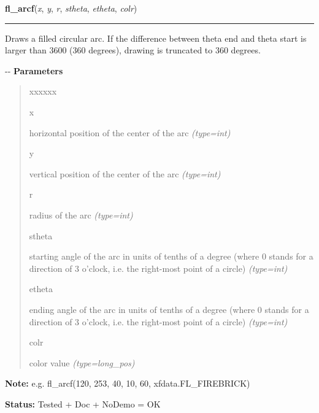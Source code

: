     \label{xformslib:flxbasic:fl_arcf}

    \vspace{0.5ex}

\hspace{.8\funcindent}\begin{boxedminipage}{\funcwidth}

    \raggedright \textbf{fl\_arcf}(\textit{x}, \textit{y}, \textit{r}, \textit{stheta}, \textit{etheta}, \textit{colr})

    \vspace{-1.5ex}

    \rule{\textwidth}{0.5\fboxrule}
\setlength{\parskip}{2ex}

Draws a filled circular arc. If the difference between theta end and
theta start is larger than 3600 (360 degrees), drawing is truncated to
360 degrees.

-{}-
\setlength{\parskip}{1ex}
      \textbf{Parameters}
      \vspace{-1ex}

      \begin{quote}
        \begin{Ventry}{xxxxxx}

          \item[x]


horizontal position of the center of the arc
            {\it (type=int)}

          \item[y]


vertical position of the center of the arc
            {\it (type=int)}

          \item[r]


radius of the arc
            {\it (type=int)}

          \item[stheta]


starting angle of the arc in units of tenths of a degree (where 0
stands for a direction of 3 o'clock, i.e. the right-most point of a
circle)
            {\it (type=int)}

          \item[etheta]


ending angle of the arc in units of tenths of a degree (where 0
stands for a direction of 3 o'clock, i.e. the right-most point of a
circle)
            {\it (type=int)}

          \item[colr]


color value
            {\it (type=long\_pos)}

        \end{Ventry}

      \end{quote}

\textbf{Note:} 
e.g. fl\_arcf(120, 253, 40, 10, 60, xfdata.FL\_FIREBRICK)


\textbf{Status:} 
Tested + Doc + NoDemo = OK


    \end{boxedminipage}

